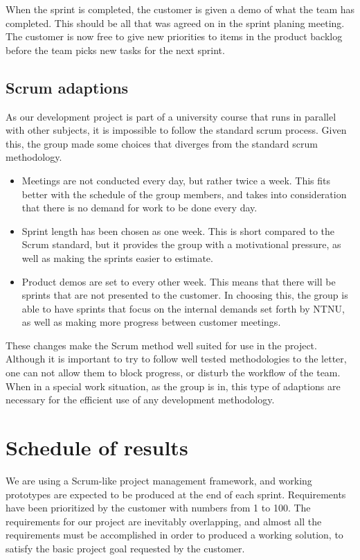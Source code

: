 \documentclass[11pt,a4paper,titlepage,oneside]{report}
\begin{document}
When the sprint is completed, the customer is given a demo of what the team has completed. This should be all that was agreed on in the sprint planing meeting. The customer is now free to give new priorities to items in the product backlog before the team picks new tasks for the next sprint. 

\subsection{Scrum adaptions}
As our development project is part of a university course that runs in parallel with other subjects, it is impossible to follow the standard scrum process. Given this, the group made some choices that diverges from the standard scrum methodology.

\begin{itemize}
\item Meetings are not conducted every day, but rather twice a week. This fits better with the schedule of the group members, and takes into consideration that there is no demand for work to be done every day. 
\item Sprint length has been chosen as one week. This is short compared to the Scrum standard, but it provides the group with a motivational pressure, as well as making the sprints easier to estimate. 
\item Product demos are set to every other week. This means that there will be sprints that are not presented to the customer. In choosing this, the group is able to have sprints that focus on the internal demands set forth by NTNU, as well as making more progress between customer meetings.
\end {itemize}

These changes make the Scrum method well suited for use in the project. Although it is important to try to follow well tested methodologies to the letter, one can not allow them to block progress, or disturb the workflow of the team. When in a special work situation, as the group is in, this type of adaptions are necessary for the efficient use of any development methodology. 

\section{Schedule of results}
We are using a Scrum-like project management framework, and working prototypes are expected to be produced at the end of each sprint. Requirements have been prioritized by the customer with numbers from 1 to 100. The requirements for our project are inevitably overlapping, and almost all the requirements must be accomplished in order to produced a working solution, to satisfy the basic project goal requested by the customer.
\end{document}
